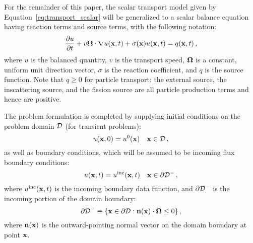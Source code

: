 For the remainder of this paper, the scalar transport model given by
Equation~\eqref{eq:transport_scalar} will be generalized to a scalar
balance equation having reaction terms and source terms, with the following
notation:
\begin{equation}\label{eq:scalar_model}
  \frac{\partial u}{\partial t} + v\mathbf{\Omega}\cdot\nabla u(\mathbf{x},t)
    + \sigma(\mathbf{x}) u(\mathbf{x},t) = q(\mathbf{x},t)
  \,,
\end{equation}
where $u$ is the balanced quantity, $v$ is the transport speed, $\mathbf{\Omega}$ is
a constant, uniform unit direction vector, $\sigma$ is the reaction coefficient,
and $q$ is the source function. Note that $q \ge 0$ for particle transport: the
external source, the inscattering source, and the fission source are all particle
production terms and hence are positive. 

The problem formulation is completed by supplying initial conditions on the
problem domain $\mathcal{D}$ (for transient problems):
\begin{equation}
  u(\mathbf{x},0) = u^0(\mathbf{x}) \quad \mathbf{x}\in\mathcal{D} \,,
\end{equation}
as well as boundary conditions,
which will be assumed to be incoming flux boundary conditions:
\begin{equation}
  u(\mathbf{x},t) = u^{\textup{inc}}(\mathbf{x},t) \quad \mathbf{x}\in\partial\mathcal{D}^- \,,
\end{equation}
where $u^{\textup{inc}}(\mathbf{x},t)$ is the incoming boundary data function, and
$\partial\mathcal{D}^-$ is the incoming portion of the domain boundary:
\begin{equation}
  \partial\mathcal{D}^- \equiv \{ \mathbf{x}\in\partial\mathcal{D} :
  \mathbf{n}(\mathbf{x})\cdot\mathbf{\Omega} \leq 0 \} \,,
\end{equation}
where $\mathbf{n}(\mathbf{x})$ is the outward-pointing normal vector on the domain
boundary at point $\mathbf{x}$.

